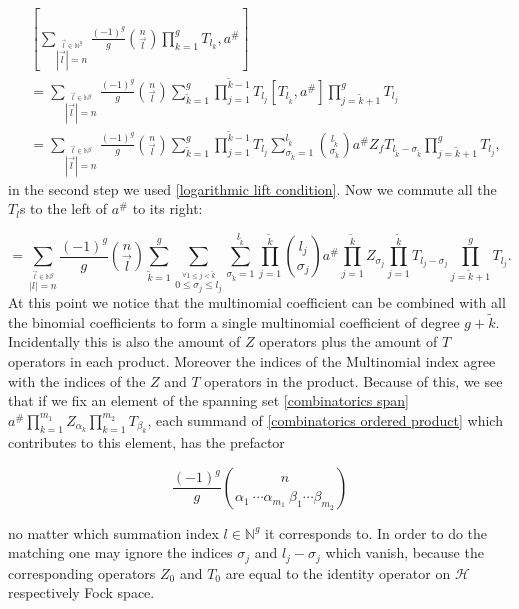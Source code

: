 \documentclass[b5paper,draft,openbib,12pt]{memoir}
\begin{document}
\begin{align*}
&\left[ \sum_{\stackrel{\vec{l}\in\mathbb{N}^g}{|\vec{l}|=n}} \frac{(-1)^g}{g} \binom{n}{\vec{l}}
 \prod_{k=1}^g T_{l_k},a^\#\right]\\
 &= \sum_{\stackrel{\vec{l}\in\mathbb{N}^g}{|\vec{l}|=n}} \frac{(-1)^g}{g} \binom{n}{\vec{l}}
 \sum_{\tilde{k}=1}^g \prod_{j=1}^{\tilde{k}-1} T_{l_j} 
 \left[ T_{l_{\tilde{k}}},a^\#\right] \prod_{j=\tilde{k}+1}^g T_{l_j}\\
&=\sum_{\stackrel{\vec{l}\in\mathbb{N}^g}{|\vec{l}|=n}} \frac{(-1)^g}{g} \binom{n}{\vec{l}}
 \sum_{\tilde{k}=1}^g \prod_{j=1}^{\tilde{k}-1} T_{l_j} 
\sum_{\sigma_{\tilde{k}}=1}^{l_{\tilde{k}}} \binom{l_{\tilde{k}}}{\sigma_{\tilde{k}}} 
a^\# Z_f T_{l_{\tilde{k}}-\sigma_{\tilde{k}}} \prod_{j=\tilde{k}+1}^g T_{l_j},
\end{align*}
in the second step we used \eqref{logarithmic lift condition}. Now we commute
all the \(T_l\)s to the left of \(a^\#\) to its right:

\begin{equation}\label{combinatorics ordered product}
=\!\!\! \sum_{\stackrel{\vec{l}\in\mathbb{N}^g}{|l|=n}} \!\!\frac{(-1)^g}{g}\! \binom{n}{\vec{l}}
\!\! \sum_{\tilde{k}=1}^g \!\sum_{\stackrel{\forall 1\le j <\tilde{k}}{0\le \sigma_{j}\le l_j}}
\!\sum_{\sigma_{\tilde{k}}=1}^{l_{\tilde{k}}} \prod_{j=1}^{\tilde{k}}\! \binom{l_j}{\sigma_j}
a^\# \prod_{j=1}^{\tilde{k}} Z_{\sigma_j} \prod_{j=1}^{\tilde{k}} T_{l_j-\sigma_j}
\!\!\prod_{j=\tilde{k}+1}^g T_{l_j}.
\end{equation}
At this point we notice that the multinomial coefficient can be combined with all
the binomial coefficients to form a single multinomial coefficient of degree
\(g+\tilde{k}\). Incidentally this is also the amount of \(Z\) operators plus the amount
of \(T\) operators in each product. Moreover the indices of the Multinomial index
agree with the indices of the \(Z\) and \(T\) operators in the product. Because of 
this, we see that if we fix an element of the spanning set \eqref{combinatorics span}
\(a^\# \prod_{k=1}^{m_1} Z_{\alpha_k} \prod_{k=1}^{m_2}T_{\beta_k}\), each 
summand of \eqref{combinatorics ordered product} which contributes to
this element, has the prefactor

\begin{equation}
\frac{(-1)^g}{g} \binom{n}{\alpha_1 \ \cdots \alpha_{m_1} \ \beta_1 \cdots \beta_{m_2}}
\end{equation}

no matter which summation index \(l\in\mathbb{N}^g\) it corresponds to. In order
to do the matching one may ignore the indices \(\sigma_j\) and \(l_j-\sigma_j\) 
which vanish, because the corresponding operators \(Z_0\) and \(T_0\) are equal to
the identity operator on \(\mathcal{H}\) respectively Fock space. 
\end{document}
